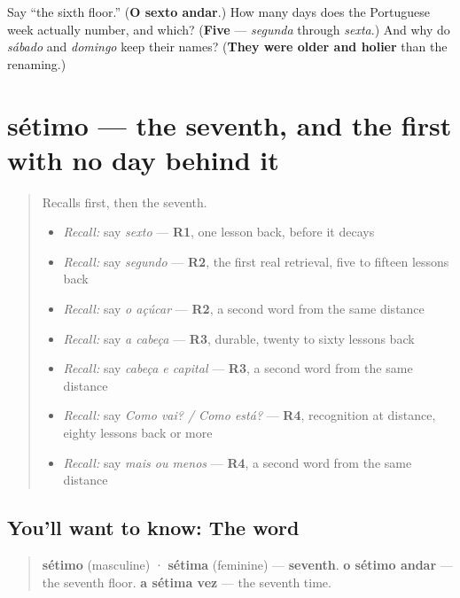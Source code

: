 \begin{tcolorbox}[breakable,colback=teal!4,colframe=teal!35!black,title={Before you move on}]
Say \textquotedblleft{}the sixth floor.\textquotedblright{} (\textbf{O sexto andar}.) How many days does the Portuguese week actually number, and which? (\textbf{Five} — \emph{segunda} through \emph{sexta}.) And why do \emph{sábado} and \emph{domingo} keep their names? (\textbf{They were older and holier} than the renaming.)
\end{tcolorbox}
\section[sétimo / sétima]{sétimo — the seventh, and the first with no day behind it}

\label{lesson:PT-C28-setimo}



\begin{quote}
Recalls first, then the seventh.

\begin{itemize}
\raggedright
  \item \emph{Recall:} say \emph{sexto} — \textbf{R1}, one lesson back, before it decays
  \item \emph{Recall:} say \emph{segundo} — \textbf{R2}, the first real retrieval, five to fifteen lessons back
  \item \emph{Recall:} say \emph{o açúcar} — \textbf{R2}, a second word from the same distance
  \item \emph{Recall:} say \emph{a cabeça} — \textbf{R3}, durable, twenty to sixty lessons back
  \item \emph{Recall:} say \emph{cabeça e capital} — \textbf{R3}, a second word from the same distance
  \item \emph{Recall:} say \emph{Como vai? / Como está?} — \textbf{R4}, recognition at distance, eighty lessons back or more
  \item \emph{Recall:} say \emph{mais ou menos} — \textbf{R4}, a second word from the same distance
\end{itemize}
\end{quote}

\subsection*{You'll want to know: The word}
\begin{quote}
\textbf{sétimo} (masculine) · \textbf{sétima} (feminine) — \textbf{seventh}. \textbf{o sétimo andar} — the seventh floor. \textbf{a sétima vez} — the seventh time.
\end{quote}


